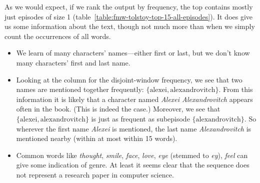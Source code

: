 As we would expect, if we rank the output by frequency, the top contains mostly just episodes of size 1 (table~\ref{table:fmw-tolstoy-top-15-all-episodes}). It does give us some information about the text, though not much more than when we simply count the occurrences of all words.

\begin{itemize}
\item We learn of many characters' names---either first or last, but we don't know many characters' first and last name.
\item Looking at the column for the disjoint-window frequency, we see that two names are mentioned together frequently: $ \{ \text{alexei}, \text{alexandrovitch} \} $. From this information it is likely that a character named \emph{Alexei Alexandrovitch} appears often in the book. (This is indeed the case.) Moreover, we see that $ \{ \text{alexei}, \text{alexandrovitch} \} $ is just as frequent as subepisode $ \{ \text{alexandrovitch} \} $. So wherever the first name \emph{Alexei} is mentioned, the last name \emph{Alexandrovitch} is mentioned nearby (within at most within 15 words).
\item Common words like \emph{thought}, \emph{smile}, \emph{face}, \emph{love}, \emph{eye} (stemmed to \emph{ey}), \emph{feel} can give some indication of genre. At least it seems clear that the sequence does not represent a research paper in computer science.

\end{itemize}


